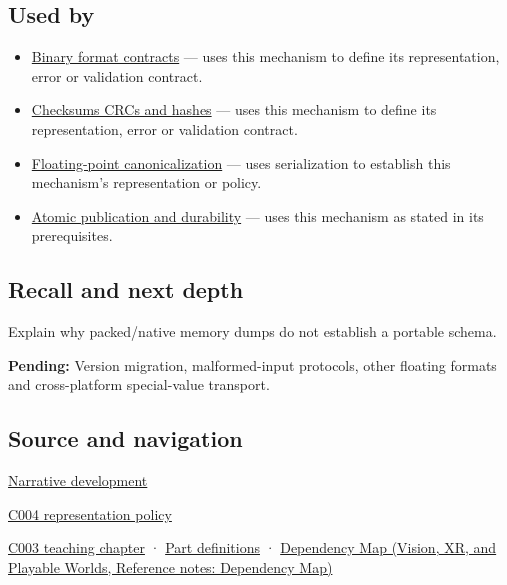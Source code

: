 \subsection{Used by}\label{appendix-91d09ebed979-used-by}

\begin{itemize}
\item
  \hyperref[appendix-590bbb2424c1]{Binary format contracts} --- uses this mechanism to define its representation, error or validation contract.
\item
  \hyperref[appendix-ed338677de0a]{Checksums CRCs and hashes} --- uses this mechanism to define its representation, error or validation contract.
\item
  \hyperref[appendix-e90053a4b201]{Floating-point canonicalization} --- uses serialization to establish this mechanism's representation or policy.
\item
  \hyperref[appendix-e89a8f290ef5]{Atomic publication and durability} --- uses this mechanism as stated in its prerequisites.
\end{itemize}

\subsection{Recall and next depth}\label{appendix-91d09ebed979-recall-and-next-depth}

Explain why packed/native memory dumps do not establish a portable schema.

\textbf{Pending:} Version migration, malformed-input protocols, other floating formats and cross-platform special-value transport.

\subsection{Source and navigation}\label{appendix-91d09ebed979-source-and-navigation}

\hyperref[01-foundations-i-ch002-bytes-become-a-durable-agreement]{Narrative development}

\hyperref[01-foundations-i-ch001-a-stretching-ruler-for-real-valued-quantities]{C004 representation policy}

\hyperref[01-foundations-i-ch002-where-the-bytes-live]{C003 teaching chapter} · \hyperref[appendix-fd090d982a15-m003---parts-41-60]{Part definitions} · \href{../07-Vision-XR-and-Playable-Worlds/main.pdf\#nameddest=appendix-4ad47bdd269a}{Dependency Map (Vision, XR, and Playable Worlds, Reference notes: Dependency Map)}
